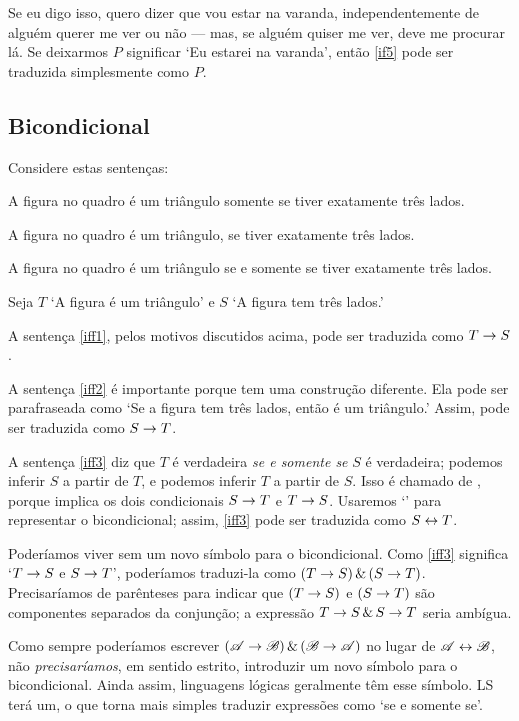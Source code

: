 Se eu digo isso, quero dizer que vou estar na varanda, independentemente de alguém querer me ver ou não — mas, se alguém quiser me ver, deve me procurar lá. Se deixarmos $P$ significar `Eu estarei na varanda', então \ref{if5} pode ser traduzida simplesmente como $P$.


\subsection{Bicondicional}
Considere estas sentenças:
\begin{earg}
\item[\ex{iff1}] A figura no quadro é um triângulo somente se tiver exatamente três lados.
\item[\ex{iff2}] A figura no quadro é um triângulo, se tiver exatamente três lados.
\item[\ex{iff3}] A figura no quadro é um triângulo se e somente se tiver exatamente três lados.
\end{earg}

Seja $T$ `A figura é um triângulo' e $S$ `A figura tem três lados.'

A sentença \ref{iff1}, pelos motivos discutidos acima, pode ser traduzida como $T\rightarrow S$.

A sentença \ref{iff2} é importante porque tem uma construção diferente. Ela pode ser parafraseada como `Se a figura tem três lados, então é um triângulo.' Assim, pode ser traduzida como $S\rightarrow T$.

A sentença \ref{iff3} diz que $T$ é verdadeira \emph{se e somente se} $S$ é verdadeira; podemos inferir $S$ a partir de $T$, e podemos inferir $T$ a partir de $S$. Isso é chamado de , porque implica os dois condicionais $S\rightarrow T$ e $T \rightarrow S$. Usaremos `\eiff' para representar o bicondicional; assim, \ref{iff3} pode ser traduzida como $S \leftrightarrow T$.

Poderíamos viver sem um novo símbolo para o bicondicional. Como \ref{iff3} significa `$T \rightarrow S$ e $S\rightarrow T$', poderíamos traduzi-la como $(T \rightarrow S)\,\&\,(S\rightarrow T)$. Precisaríamos de parênteses para indicar que $(T \rightarrow S)$ e $(S\rightarrow T)$ são componentes separados da conjunção; a expressão $T \rightarrow S\,\&\, S\rightarrow T$ seria ambígua.

Como sempre poderíamos escrever $(\mathscr{A}\rightarrow\mathscr{B})\,\&\,(\mathscr{B}\rightarrow\mathscr{A})$ no lugar de $\mathscr{A}\leftrightarrow\mathscr{B}$, não \emph{precisaríamos}, em sentido estrito, introduzir um novo símbolo para o bicondicional. Ainda assim, linguagens lógicas geralmente têm esse símbolo. LS terá um, o que torna mais simples traduzir expressões como `se e somente se'.

